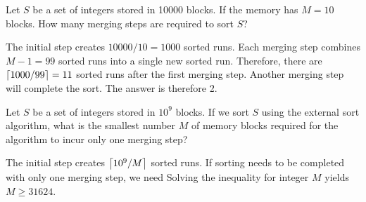  Let $S$ be a set of integers stored in 10000 blocks. If the memory has $M = 10$ blocks. How many merging steps are required to sort $S$?

\begin{sol}
 The initial step creates $10000/10 = 1000$ sorted runs. Each merging step combines $M - 1 = 99$ sorted runs into a single new sorted run. Therefore, there are $\left \lceil 1000/99 \right \rceil = 11$ sorted runs after the first merging step. Another merging step will complete the sort. The answer is therefore 2.
\end{sol}

 Let $S$ be a set of integers stored in $10^9$ blocks. If we sort $S$ using the external sort algorithm, what is the smallest number $M$ of memory blocks required for the algorithm to incur only one merging step?

\begin{sol}
 The initial step creates $\left \lceil 10^9 / M \right \rceil$ sorted runs. If sorting needs to be completed with only one merging step, we need
Solving the inequality for integer $M$ yields $M \ge 31624$.

\end{sol}



